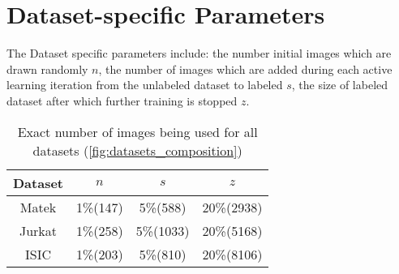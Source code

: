 \section{Dataset-specific Parameters}\label{section:dataset_specific_parameters}
The Dataset specific parameters include: the number initial images which are drawn randomly $n$, the number of images which are added during each active learning iteration from the unlabeled dataset to labeled $s$, the size of labeled dataset after which further training is stopped $z$.
\vspace{0.5cm}
\begin{table}[htbp]
\captionsetup{format=plain}
\centering
 \begin{tabular}{c c c c} 
 \hline
 Dataset & $n$ & $s$ & $z$ \\ [0.5ex] 
 \hline
 Matek & 1\%\hspace{0.35cm}(147) & 5\%\hspace{0.35cm}(588) & 20\%\hspace{0.35cm}(2938) \\ 
 Jurkat & 1\%\hspace{0.35cm}(258) & \hspace{0.20cm}5\%\hspace{0.35cm}(1033) & 20\%\hspace{0.35cm}(5168) \\
 ISIC & 1\%\hspace{0.35cm}(203) & 5\%\hspace{0.35cm}(810) & 20\%\hspace{0.35cm}(8106) \\
 \hline
\end{tabular}
\caption{Exact number of images being used for all datasets (\ref{fig:datasets_composition})}
\label{table:datasets_splits}
\end{table}


